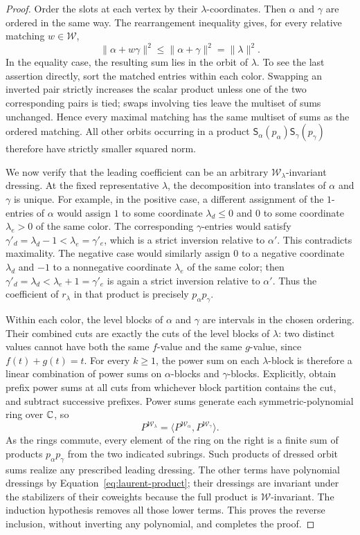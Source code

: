 \begin{proof}
Order the slots at each vertex by their $\lambda$-coordinates.  Then
$\alpha$ and $\gamma$ are ordered in the same way.  The rearrangement
inequality gives, for every relative matching $w\in\mathcal W$,
\[
 \|\alpha+w\gamma\|^2
 \leq\|\alpha+\gamma\|^2=\|\lambda\|^2.
\]
In the equality case, the resulting sum lies in the orbit of $\lambda$.
To see the last assertion directly, sort the matched entries within
each color.  Swapping an inverted pair strictly increases the scalar
product unless one of the two corresponding pairs is tied; swaps
involving ties leave the multiset of sums unchanged.  Hence every
maximal matching has the same multiset of sums as the ordered matching.
All other orbits occurring in a product
$\mathsf S_\alpha(p_\alpha)\mathsf S_\gamma(p_\gamma)$ therefore have
strictly smaller squared norm.

We now verify that the leading coefficient can be an arbitrary
$\mathcal W_\lambda$-invariant dressing.  At the fixed representative
$\lambda$, the decomposition into translates of $\alpha$ and $\gamma$
is unique.  For example, in the positive case, a different assignment
of the $1$-entries of $\alpha$ would assign $1$ to some coordinate
$\lambda_d\leq0$ and $0$ to some coordinate $\lambda_e>0$ of the same
color.  The corresponding $\gamma$-entries would satisfy
$\gamma'_d=\lambda_d-1<\lambda_e=\gamma'_e$, which is a strict
inversion relative to $\alpha'$.  This contradicts maximality.  The
negative case would similarly assign $0$ to a negative coordinate
$\lambda_d$ and $-1$ to a nonnegative coordinate $\lambda_e$ of the
same color; then $\gamma'_d=\lambda_d<\lambda_e+1=\gamma'_e$ is again
a strict inversion relative to $\alpha'$.  Thus the
coefficient of $r_\lambda$ in that product is precisely
$p_\alpha p_\gamma$.

Within each color, the level blocks of $\alpha$ and $\gamma$ are
intervals in the chosen ordering.  Their combined cuts are exactly the
cuts of the level blocks of $\lambda$: two distinct values cannot have
both the same $f$-value and the same $g$-value, since $f(t)+g(t)=t$.
For every $k\geq1$, the power sum on each $\lambda$-block is therefore
a linear combination of power sums on $\alpha$-blocks and
$\gamma$-blocks.  Explicitly, obtain prefix power sums at all cuts
from whichever block partition contains the cut, and subtract
successive prefixes.  Power sums generate each symmetric-polynomial
ring over $\mathbb C$, so
\[
 P^{\mathcal W_\lambda}
 =\bigl\langle P^{\mathcal W_\alpha},
                 P^{\mathcal W_\gamma}\bigr\rangle.
\]
As the rings commute, every element of the ring on the right is a
finite sum of products $p_\alpha p_\gamma$ from the two indicated
subrings.  Such products of dressed orbit sums realize any prescribed
leading dressing.  The other terms have polynomial dressings by
Equation~\eqref{eq:laurent-product}; their dressings are invariant under
the stabilizers of their coweights because the full product is
$\mathcal W$-invariant.  The induction hypothesis removes all those
lower terms.  This proves the reverse inclusion, without inverting any
polynomial, and completes the proof.
\end{proof}

